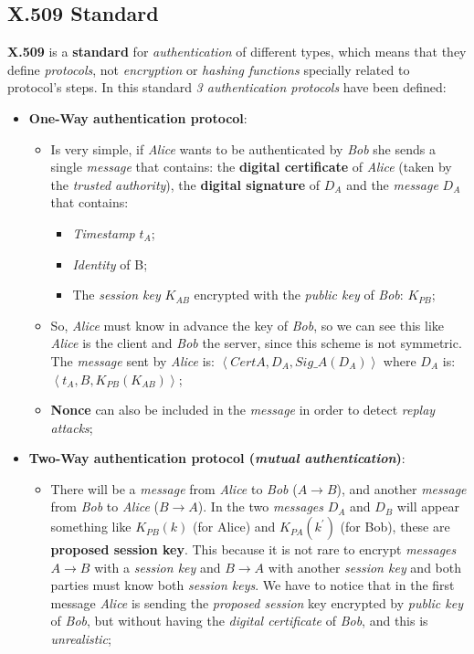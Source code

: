 \documentclass{article}
\begin{document}
\subsection{X.509 Standard}
\textbf{X.509} is a \textbf{standard} for \emph{authentication} of different types, which means that they define \emph{protocols}, not \emph{encryption} or \emph{hashing functions }specially related to protocol's steps. In this standard\emph{ 3 authentication protocols} have been defined: 
\begin{itemize}
\item \textbf{One-Way authentication protocol}:
\begin{itemize}
\item Is very simple, if \emph{Alice} wants to be authenticated by \emph{Bob} she sends a single \emph{message} that contains: the \textbf{digital certificate} of \emph{Alice} (taken by the \emph{trusted authority}), the \textbf{digital signature} of $D_A$ and the \emph{message} $D_A$ that contains:
\begin{itemize}
\item \emph{Timestamp} $t_A$;
\item \emph{Identity} of B;
\item The \emph{session key} $K_{AB}$ encrypted with the \emph{public key} of \emph{Bob}: $K_{PB}$;
\end{itemize}
\item So, \emph{Alice} must know in advance the key of \emph{Bob}, so we can see this like \emph{Alice} is the client and \emph{Bob} the server, since this scheme is not symmetric. The \emph{message} sent by \emph{Alice} is: $\left \langle CertA, D_A, Sig\_A(D_A) \right \rangle$ where $D_A$ is: $\left \langle t_A, B, K_{PB}(K_{AB}) \right \rangle$;
\item \textbf{Nonce} can also be included in the \emph{message} in order to detect \emph{replay attacks};
\end{itemize}
\item \textbf{Two-Way authentication protocol (\emph{mutual authentication})}:
\begin{itemize}
\item There will be a \emph{message} from \emph{Alice} to \emph{Bob} ($A \rightarrow B$), and another \emph{message} from \emph{Bob} to \emph{Alice} ($B \rightarrow A$). In the two \emph{messages} $D_A$ and $D_B$ will appear something like $K_{PB}(k)$ (for Alice) and $K_{PA}(k^{'})$ (for Bob), these are \textbf{proposed session key}. This because it is not rare to encrypt \emph{messages} $A\rightarrow B$ with a \emph{session key} and $B\rightarrow A$ with another\emph{ session key} and both parties must know both \emph{session keys}. We have to notice that in the first message \emph{Alice} is sending the \emph{proposed session} key encrypted by \emph{public key} of \emph{Bob}, but without having the \emph{digital certificate} of \emph{Bob}, and this is \emph{unrealistic};

\end{itemize}
\end{itemize}
\end{document}
